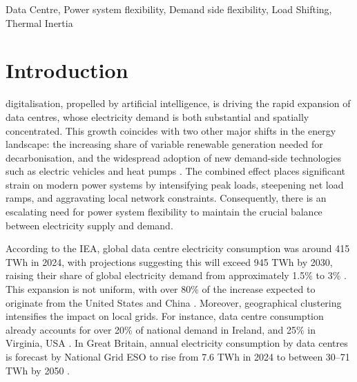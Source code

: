 \documentclass[lettersize,journal]{IEEEtran}
\begin{document}
\begin{IEEEkeywords}
Data Centre, Power system flexibility, Demand side flexibility, Load Shifting, Thermal Inertia
\end{IEEEkeywords}

\section{Introduction}

 digitalisation, propelled by artificial intelligence, is driving the rapid expansion of data centres, whose electricity demand is both substantial and spatially concentrated. This growth coincides with two other major shifts in the energy landscape: the increasing share of variable renewable generation needed for decarbonisation, and the widespread adoption of new demand-side technologies such as electric vehicles and heat pumps \cite{Centrica2020LEM, EEAACER2023Flex}. The combined effect places significant strain on modern power systems by intensifying peak loads, steepening net load ramps, and aggravating local network constraints. Consequently, there is an escalating need for power system flexibility to maintain the crucial balance between electricity supply and demand.

According to the IEA, global data centre electricity consumption was around 415 TWh in 2024, with projections suggesting this will exceed 945 TWh by 2030, raising their share of global electricity demand from approximately 1.5\% to 3\% \cite{iea_energy_ai}. This expansion is not uniform, with over 80\% of the increase expected to originate from the United States and China \cite{iea_energy_ai}. Moreover, geographical clustering intensifies the impact on local grids. For instance, data centre consumption already accounts for over 20\% of national demand in Ireland, and 25\% in Virginia, USA \cite{iea_energy_ai}. In Great Britain, annual electricity consumption by data centres is forecast by National Grid ESO to rise from 7.6 TWh in 2024 to between 30--71 TWh by 2050 \cite{neso2025future}.
\end{document}
